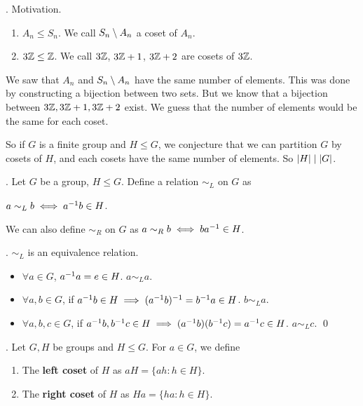 
\ex. Motivation.
\begin{enumerate}
    \item \(A_n \leq S_n\). We call \(S_n \setminus A_n\) a coset of \(A_n\).
    \item \(3\mathbb{Z} \leq \mathbb{Z}\). We call \(3\mathbb{Z}\), \(3\mathbb{Z} + 1\), \(3\mathbb{Z} + 2\) are cosets of \(3\mathbb{Z}\).
\end{enumerate}

We saw that \(A_n\) and \(S_n \setminus A_n\) have the same number of elements. This was done by constructing a bijection between two sets. But we know that a bijection between \(3\mathbb{Z}, 3\mathbb{Z} + 1, 3\mathbb{Z} + 2\) exist. We guess that the number of elements would be the same for each coset.

So if \(G\) is a finite group and \(H \leq G\), we conjecture that we can partition \(G\) by cosets of \(H\), and each cosets have the same number of elements. So \(\left| H \right| \mid \left| G \right|\).

\bigskip

. Let \(G\) be a group, \(H \leq G\). Define a relation \(\sim_L\) on \(G\) as
\begin{center}
    \(a \sim_L b \iff a^{-1} b \in H\).
\end{center}

\rmk We can also define \(\sim_R\) on \(G\) as \(a \sim_R b \iff ba^{-1} \in H\).

\thm. \(\sim_L\) is an equivalence relation.

\pf
\begin{itemize}
    \item \(\forall a \in G\), \(a^{-1} a = e \in H\). \(a \sim_L a\).
    \item \(\forall a, b\in G\), if \(a^{-1} b \in H \implies (a^{-1} b)^{-1} = b^{-1} a \in H\). \(b \sim_L a\).
    \item\(\forall a, b, c\in G\), if \(a^{-1} b, b^{-1} c \in H \implies (a^{-1} b)(b^{-1} c) = a^{-1} c \in H\). \(a \sim_L c\). \qed
\end{itemize}

.  Let \(G, H\) be groups and \(H \leq G\). For \(a \in G\), we define
\begin{enumerate}
    \item The \textbf{left coset} of \(H\) as \(aH = \{ah : h \in H\}\).
    \item The \textbf{right coset} of \(H\) as \(Ha = \{ha : h \in H\}\).
\end{enumerate}

